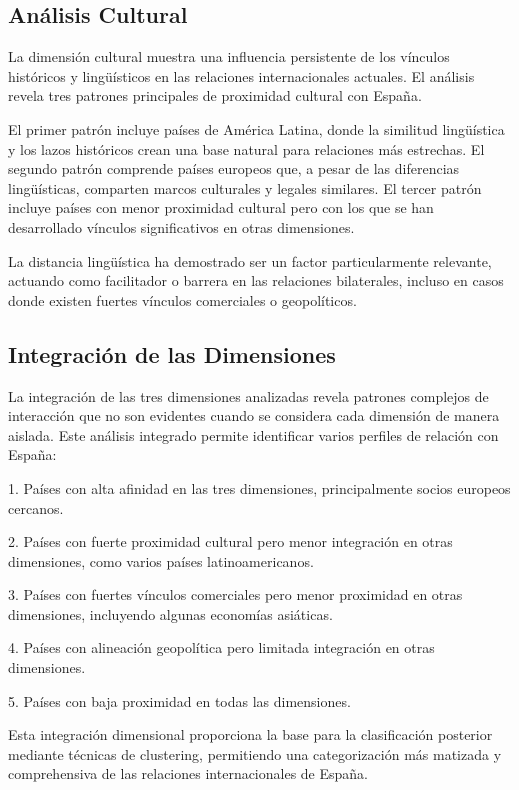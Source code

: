 \documentclass[11pt,a4paper]{article}
\begin{document}
\subsection{Análisis Cultural}

La dimensión cultural muestra una influencia persistente de los vínculos históricos y lingüísticos en las relaciones internacionales actuales. El análisis revela tres patrones principales de proximidad cultural con España.

El primer patrón incluye países de América Latina, donde la similitud lingüística y los lazos históricos crean una base natural para relaciones más estrechas. El segundo patrón comprende países europeos que, a pesar de las diferencias lingüísticas, comparten marcos culturales y legales similares. El tercer patrón incluye países con menor proximidad cultural pero con los que se han desarrollado vínculos significativos en otras dimensiones.

La distancia lingüística ha demostrado ser un factor particularmente relevante, actuando como facilitador o barrera en las relaciones bilaterales, incluso en casos donde existen fuertes vínculos comerciales o geopolíticos.

\subsection{Integración de las Dimensiones}

La integración de las tres dimensiones analizadas revela patrones complejos de interacción que no son evidentes cuando se considera cada dimensión de manera aislada. Este análisis integrado permite identificar varios perfiles de relación con España:

1. Países con alta afinidad en las tres dimensiones, principalmente socios europeos cercanos.

2. Países con fuerte proximidad cultural pero menor integración en otras dimensiones, como varios países latinoamericanos.

3. Países con fuertes vínculos comerciales pero menor proximidad en otras dimensiones, incluyendo algunas economías asiáticas.

4. Países con alineación geopolítica pero limitada integración en otras dimensiones.

5. Países con baja proximidad en todas las dimensiones.

Esta integración dimensional proporciona la base para la clasificación posterior mediante técnicas de clustering, permitiendo una categorización más matizada y comprehensiva de las relaciones internacionales de España.
\end{document}
